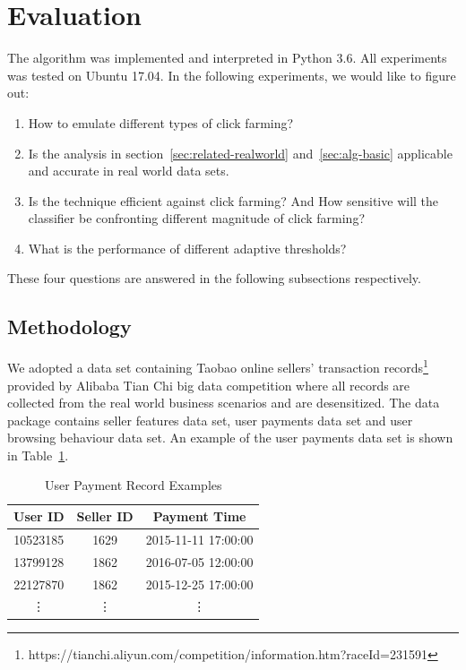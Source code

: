 \documentclass[10pt,conference,letterpaper]{IEEEtran}
\begin{document}
	\section{Evaluation}\label{sec:evaluation}
		The algorithm was implemented and interpreted in Python 3.6. All experiments was tested on Ubuntu 17.04. In the following experiments, we would like to figure out:
	
		\begin{enumerate}
			\item How to emulate different types of click farming?
			\item Is the analysis in section~\ref{sec:related-realworld} and~\ref{sec:alg-basic} applicable and accurate in real world data sets.
			\item Is the technique efficient against click farming? And How sensitive will the classifier be confronting different magnitude of click farming?
			\item What is the performance of different adaptive thresholds?
		\end{enumerate}
	
		These four questions are answered in the following subsections respectively.
	
		\subsection{Methodology}\label{sec:exp-methodology}
			We adopted a data set containing Taobao online sellers' transaction records\footnote{https://tianchi.aliyun.com/competition/information.htm?raceId=231591} provided by Alibaba Tian Chi big data competition where all records are collected from the real world business scenarios and are desensitized. The data package contains seller features data set, user payments data set and user browsing behaviour data set. An example of the user payments data set is shown in Table~\ref{tab:user-payment-sample}.
	
			\begin{table}[!ht]
				\centering
				\caption{User Payment Record Examples}
				\label{tab:user-payment-sample}
				\begin{tabular}{|c|c|c|}
					\hline
					User ID & Seller ID & Payment Time\\
					\hline
					10523185 & 1629 & 2015-11-11 17:00:00\\
					\hline
					13799128 & 1862 & 2016-07-05 12:00:00\\
					\hline
					22127870 & 1862 & 2015-12-25 17:00:00\\
					\hline
					\vdots & \vdots & \vdots\\
					\hline
				\end{tabular}
			\end{table}
	
\end{document}
